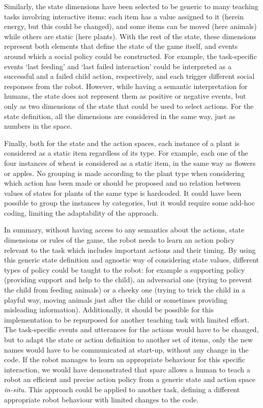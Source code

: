 Similarly, the state dimensions have been selected to be generic to many teaching tasks involving interactive items: each item has a value assigned to it (herein energy, but this could be changed), and some items can be moved (here animals) while others are static (here plants). With the rest of the state, these dimensions represent both elements that define the state of the game itself, and events around which a social policy could be constructed. For example, the task-specific events `last feeding' and `last failed interaction' could be interpreted as a successful and a failed child action, respectively, and each trigger different social responses from the robot. However, while having a semantic interpretation for humans, the state does not represent them as positive or negative events, but only as two dimensions of the state that could be used to select actions. For the state definition, all the dimensions are considered in the same way, just as numbers in the space. 

Finally, both for the state and the action spaces, each instance of a plant is considered as a static item regardless of its type. For example, each one of the four instances of wheat is considered as a static item, in the same way as flowers or apples. No grouping is made according to the plant type when considering which action has been made or should be proposed and no relation between values of states for plants of the same type is hardcoded. It could have been possible to group the instances by categories, but it would require some add-hoc coding, limiting the adaptability of the approach. 

In summary, without having access to any semantics about the actions, state dimensions or rules of the game, the robot needs to learn an action policy relevant to the task which includes important actions and their timing. By using this generic state definition and agnostic way of considering state values, different types of policy could be taught to the robot: for example a supporting policy (providing support and help to the child), an adversarial one (trying to prevent the child from feeding animals) or a cheeky one (trying to trick the child in a playful way, moving animals just after the child or sometimes providing misleading information). Additionally, it should be possible for this implementation to be repurposed for another teaching task with limited effort. The task-specific events and utterances for the actions would have to be changed, but to adapt the state or action definition to another set of items, only the new names would have to be communicated at start-up, without any change in the code. If the robot manages to learn an appropriate behaviour for this specific interaction, we would have demonstrated that \gls{sparc} allows a human to teach a robot an efficient and precise action policy from a generic state and action space \emph{in-situ}. This approach could be applied to another task, defining a different appropriate robot behaviour with limited changes to the code.

